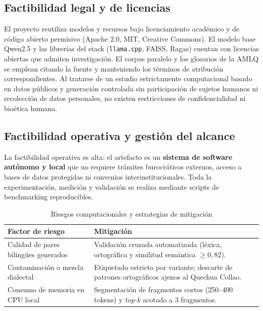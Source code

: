 \subsection{Factibilidad legal y de licencias}

El proyecto reutiliza modelos y recursos bajo licenciamiento académico y de código abierto permisivo (Apache 2.0, MIT, Creative Commons). El modelo base Qwen2.5 y las librerías del stack (\texttt{llama.cpp}, FAISS, Ragas) cuentan con licencias abiertas que admiten investigación. El corpus paralelo \citep{Orcotoma2025} y los glosarios de la AMLQ se emplean citando la fuente y manteniendo los términos de atribución correspondientes. Al tratarse de un estudio estrictamente computacional basado en datos públicos y generación controlada sin participación de sujetos humanos ni recolección de datos personales, no existen restricciones de confidencialidad ni bioética humana.

\subsection{Factibilidad operativa y gestión del alcance}

La factibilidad operativa es alta: el artefacto es un \textbf{sistema de software autónomo y local} que no requiere trámites burocráticos externos, acceso a bases de datos protegidas ni convenios interinstitucionales. Toda la experimentación, medición y validación se realiza mediante scripts de benchmarking reproducibles.

\begin{table}[H]
\centering
\caption{Riesgos computacionales y estrategias de mitigación}
\label{tab:factibilidad_operativa}
\small
\begin{tabular}{@{}p{5.5cm}p{8.5cm}@{}}
\toprule
\textbf{Factor de riesgo} & \textbf{Mitigación} \\
\midrule
Calidad de pares bilingües generados & Validación cruzada automatizada (léxica, ortográfica y similitud semántica $\ge 0,82$). \\
\midrule
Contaminación o mezcla dialectal & Etiquetado estricto por variante; descarte de patrones ortográficos ajenos al Quechua Collao. \\
\midrule
Consumo de memoria en CPU local & Segmentación de fragmentos cortos (250--400 tokens) y \textit{top-k} acotado a 3 fragmentos. \\
\bottomrule
\end{tabular}
\end{table}

